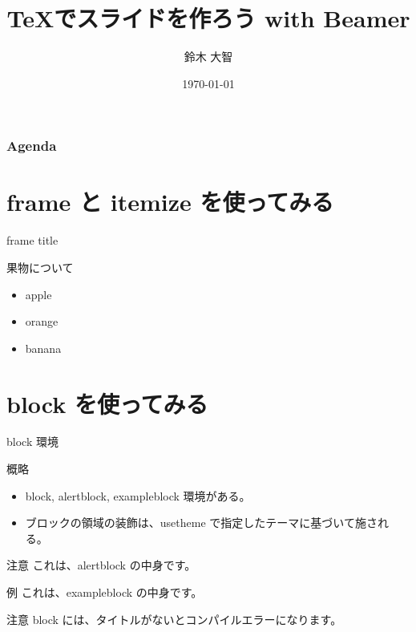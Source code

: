 \documentclass[dvipdfmx]{beamer}  %
\title[Beamer Tutorial]{\TeX でスライドを作ろう with Beamer}
\author[sudachi]{鈴木 大智}
\date{\today}
\institute[日本大学大学院]{日本大学大学院 理工学研究科 数学専攻}
\begin{document}
\frame{\maketitle}



\begin{frame}
  \frametitle{Agenda}
  \tableofcontents
\end{frame}

\section{frame と itemize を使ってみる}
\begin{frame}{frame title}

  果物について
  
  \begin{itemize}
    \item apple
    \item orange
    \item banana
  \end{itemize}
\end{frame}

\section{block を使ってみる}
\begin{frame}{block 環境}

  \begin{block}{概略}
    \begin{itemize}
      \item block, alertblock, exampleblock 環境がある。
      \item ブロックの領域の装飾は、usetheme で指定したテーマに基づいて施される。
    \end{itemize}
  \end{block}

  \begin{alertblock}{注意}
    これは、alertblock の中身です。
  \end{alertblock}

  \begin{exampleblock}{例}
    これは、exampleblock の中身です。
  \end{exampleblock}

  \begin{alertblock}{注意}
    block には、タイトルがないとコンパイルエラーになります。
  \end{alertblock}

\end{frame}
\end{document}

